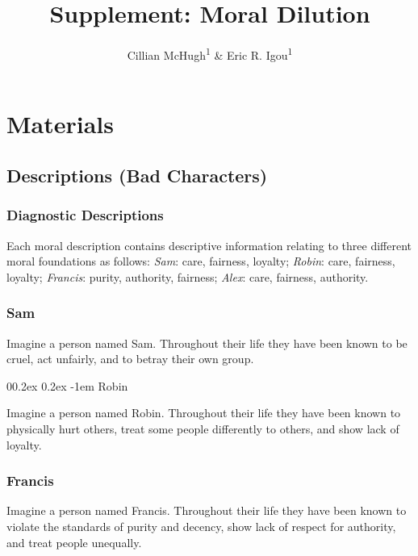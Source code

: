 \documentclass[
  man,floatsintext]{apa6}
\title{Supplement: Moral Dilution}
\author{Cillian McHugh\textsuperscript{1} \& Eric R. Igou\textsuperscript{1}}
\date{}
\affiliation{\vspace{0.5cm}\textsuperscript{1} University of Limerick}
\makeatletter
\let\oldparagraph\paragraph
\renewcommand{\paragraph}{
    \@ifstar
      \xxxParagraphStar
      \xxxParagraphNoStar
  }
\newcommand{\xxxParagraphStar}[1]{\oldparagraph*{#1}\mbox{}}
\newcommand{\xxxParagraphNoStar}[1]{\oldparagraph{#1}\mbox{}}
\renewcommand{\paragraph}{\@startsection{paragraph}{4}{\parindent}%
  {0\baselineskip \@plus 0.2ex \@minus 0.2ex}%
  {-1em}%
  {\normalfont\normalsize\bfseries\itshape\typesectitle}}
\makeatother
\begin{document}
\maketitle

{
\setcounter{tocdepth}{1}
\tableofcontents
}
\pagebreak

\section{Materials}\label{materials}

\subsection{Descriptions (Bad Characters)}\label{descriptions-bad-characters}

\subsubsection{Diagnostic Descriptions}\label{diagnostic-descriptions}

Each moral description contains descriptive information relating to three different moral foundations as follows: \emph{Sam}: care, fairness, loyalty; \emph{Robin}: care, fairness, loyalty; \emph{Francis}: purity, authority, fairness; \emph{Alex}: care, fairness, authority.

\subsubsection{Sam}\label{sam}

Imagine a person named Sam.
Throughout their life they have been known to be cruel, act unfairly, and to betray their own group.

\paragraph{Robin}\label{robin}

Imagine a person named Robin.
Throughout their life they have been known to physically hurt others, treat some people differently to others, and show lack of loyalty.

\subsubsection{Francis}\label{francis}

Imagine a person named Francis.
Throughout their life they have been known to violate the standards of purity and decency, show lack of respect for authority, and treat people unequally.
\end{document}
